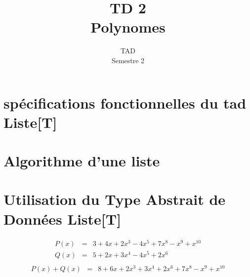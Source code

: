 \documentclass{article}
\title{TD 2\\ Polynomes}
\date{TAD\\ Semestre 2}
\begin{document}
	\maketitle
	\section{}
	\section{spécifications fonctionnelles du tad Liste[T]}		
		
	\section{Algorithme d'une liste}
		
	\section{Utilisation du Type Abstrait de Données Liste[T]}
		\begin{eqnarray*}
			P(x) &=& 3 + 4x + 2x^{3} - 4x^{5} + 7x^{8} - x^{9} + x^{10}\\
			Q(x) &=& 5 + 2x + 3x^{4} - 4x^{5} + 2x^{6}\\
		\end{eqnarray*}
		\begin{eqnarray*}
			P(x) + Q(x) &=& 8 + 6x + 2x^{3} + 3x^{4} + 2x^{6} + 7x^{8} - x^{9} + x^{10}
		\end{eqnarray*}

		
		
\end{document}
